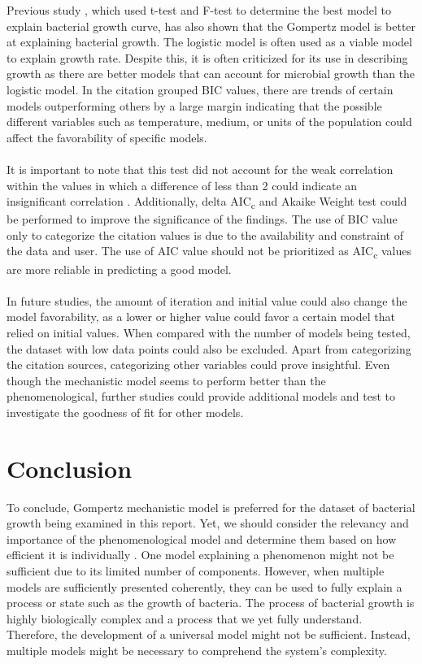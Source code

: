 \documentclass[11pt]{article}
\begin{document}
    Previous study \cite{zwietering1990modeling}, which used t-test and F-test to determine the best model to explain bacterial growth curve, has also shown that the Gompertz model is better at explaining bacterial growth. The logistic model is often used as a viable model to explain growth rate. Despite this, it is often criticized for its use in describing growth\cite{kingsland1982refractory} as there are better models that can account for microbial growth than the logistic model.
    In the citation grouped BIC values, there are trends of certain models outperforming others by a large margin indicating that the possible different variables such as temperature, medium, or units of the population could affect the favorability of specific models. 
    \\
    \\
    It is important to note that this test did not account for the weak correlation within the values in which a difference of less than 2 could indicate an insignificant correlation \cite{mazerolle2006improving}.
    Additionally, delta AIC\textsubscript{c} and Akaike Weight test could be performed to improve the significance of the findings. 
    The use of BIC value only to categorize the citation values is due to the availability and constraint of the data and user.
    The use of AIC value should not be prioritized as AIC\textsubscript{c} values are more reliable in predicting a good model. 
    \\
    \\
    In future studies, the amount of iteration and initial value could also change the model favorability, as a lower or higher value could favor a certain model that relied on initial values.
    When compared with the number of models being tested, the dataset with low data points could also be excluded.
    Apart from categorizing the citation sources, categorizing other variables could prove insightful.
    Even though the mechanistic model seems to perform better than the phenomenological, further studies could provide additional models and test to investigate the goodness of fit for other models.

    \section{Conclusion}
    To conclude, Gompertz mechanistic model is preferred for the dataset of bacterial growth being examined in this report.
    Yet, we should consider the relevancy and importance of the phenomenological model and determine them based on how efficient it is individually \cite{white2019should}.
    One model explaining a phenomenon might not be sufficient due to its limited number of components. However, when multiple models are sufficiently presented coherently, they can be used to fully explain a process or state \cite{levins1966strategy} such as the growth of bacteria.
    The process of bacterial growth is highly biologically complex and a process that we yet fully understand. 
    Therefore, the development of a universal model might not be sufficient. Instead, multiple models might be necessary to comprehend the system's complexity.

 \newpage

\end{document}
